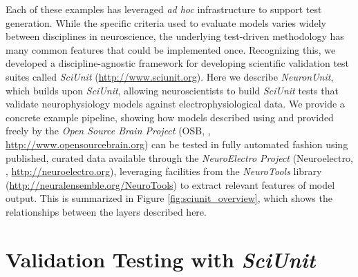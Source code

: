 \documentclass[9pt]{sig-alternate}
\begin{document}
Each of these examples has leveraged \emph{ad hoc} infrastructure to support test generation. 
While the specific criteria used to evaluate models varies widely between disciplines in neuroscience, the underlying test-driven methodology has many common features that could be implemented once. 
Recognizing this, we developed a discipline-agnostic framework for developing scientific validation test suites called \textit{SciUnit} (\url{http://www.sciunit.org}). 
Here we describe \textit{NeuronUnit\-}, which builds upon \textit{SciUnit}, allowing neuroscientists to build \textit{SciUnit} tests that validate neurophysiology models against electrophysiological data.  We provide a concrete example pipeline, showing how models described using  and provided freely by the \textit{Open Source Brain Project} (OSB, \cite{gleeson_open_2012}, \url{http://www.opensourcebrain.org}) can be tested in fully automated fashion using published, curated data available through the \textit{NeuroElectro Project} (Neuroelectro, \cite{tripathy_neuroelectro:_2012}, \url{http://neuroelectro.org}), leveraging facilities from the \textit{NeuroTools} library (\url{http://neuralensemble.org/NeuroTools}) to extract relevant features of model output.  This is summarized in Figure \ref{fig:sciunit_overview}, which shows the relationships between the layers described here.

\section{Validation Testing with \textit{SciUnit}}
\end{document}
